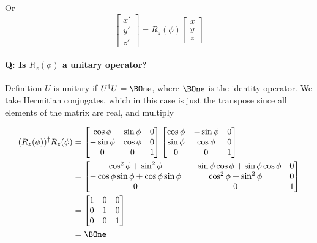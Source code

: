 Or
\begin{equation}\label{eqn:PHY356FDec7:30}
\begin{bmatrix}
x'  \\
y' \\
z'
\end{bmatrix}
=
R_z(\phi)
\begin{bmatrix}
x  \\
y \\
z
\end{bmatrix}
\end{equation}

\paragraph{Q: Is $R_z(\phi)$ a unitary operator?}

Definition $U$ is unitary if $U^\dagger U = \BOne$, where $\BOne$ is the identity operator.  We take Hermitian conjugates, which in this case is just the transpose since all elements of the matrix are real, and multiply

\begin{align*}
(R_z(\phi))^\dagger R_z(\phi) &=
\begin{bmatrix}
\cos \phi & \sin\phi & 0 \\
-\sin \phi & \cos\phi & 0 \\
0 & 0 & 1
\end{bmatrix}
\begin{bmatrix}
\cos \phi &- \sin\phi & 0 \\
\sin \phi & \cos\phi & 0 \\
0 & 0 & 1
\end{bmatrix} \\
&=
\begin{bmatrix}
\cos^2 \phi + \sin^2\phi  & -\sin\phi \cos\phi  + \sin\phi \cos\phi  & 0 \\
-\cos\phi \sin\phi  + \cos\phi \sin\phi  & \cos^2\phi  + \sin^2 \phi & 0 \\
0 & 0 & 1 \\
\end{bmatrix} \\
&=
\begin{bmatrix}
1 & 0 & 0 \\
0 & 1 & 0 \\
0 & 0 & 1 \\
\end{bmatrix} \\
&= \BOne
\end{align*}

